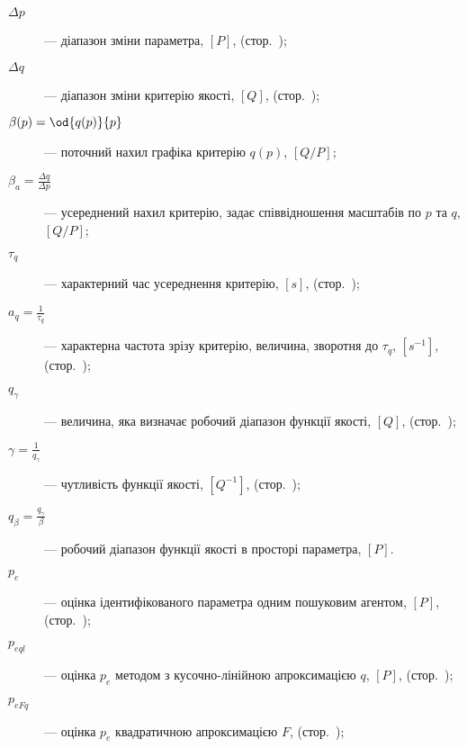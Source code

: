 \begin{description}
  \item[$\Delta p$]  ---
    діапазон зміни параметра,
    $[P]$, (стор.~\pageref{atu:d:Delta_q});

  \item[$\Delta q$]  ---
    діапазон зміни критерію якості,
    $[Q]$, (стор.~\pageref{atu:d:Delta_q});

  \item[$\beta(p) = \od{q(p)}{p}$]  ---
    поточний нахил графіка критерію
    $q(p)$, $[Q/P]$;

  \item[$\beta_a = \frac{\Delta q}{\Delta p} $]  ---
    усереднений нахил критерію, задає співвідношення масштабів по
    $p$ та $q$, $[Q/P]$;

  \item[$\tau_q$]  ---
    характерний час усереднення критерію,
    $[s]$, (стор.~\pageref{atu:d:tau_q});

  \item[$a_q = \frac{1}{\tau_q} $]  ---
    характерна частота зрізу критерію, величина, зворотня до
    $\tau_q$, $[s^{-1}]$, (стор.~\pageref{atu:d:a_q});

  \item[$q_\gamma $]  ---
    величина, яка визначає робочий діапазон функції якості,
    $[Q]$, (стор.~\pageref{atu:d:q_gamma});

  \item[$\gamma = \frac{1}{q_\gamma} $]  ---
    чутливість функції якості,
    $[Q^{-1}]$, (стор.~\pageref{atu:d:gamma});

  \item[$q_\beta = \frac{q_\gamma}{\beta} $]  ---
    робочий діапазон функції якості в просторі параметра,
    $[P]$.


  \item[$p_{e} $]  ---
    оцінка ідентифікованого параметра одним пошуковим агентом,
    $[P]$, (стор.~\pageref{atu:d:p_e});

  \item[$p_{eql} $]  ---
   оцінка $ p_e $ методом з кусочно-лінійною апроксимацією $q$,
   $[P]$, (стор.~\pageref{atu:d:p_eql});

  \item[$p_{eFq} $]  ---
    оцінка $ p_e $ квадратичною апроксимацією $F$,
    (стор.~\pageref{atu:eq:p_eFq});


\end{description}

